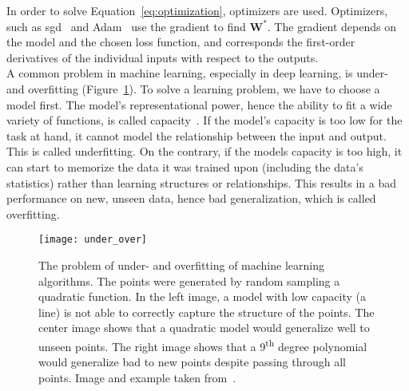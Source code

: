 In order to solve Equation~\ref{eq:optimization}, optimizers are used. Optimizers, such as \gls{sgd}~\cite{Goodfellow2016DeepLearning} and Adam~\cite{Kingma2014Adam:Optimization} use the gradient to find $\textbf{W}^*$. The gradient depends on the model and the chosen loss function, and corresponds the first-order derivatives of the individual inputs with respect to the outputs.\\

A common problem in machine learning, especially in deep learning, is under- and overfitting (Figure~\ref{fig:under_over_fitting}). To solve a learning problem, we have to choose a model first. The model's representational power, hence the ability to fit a wide variety of functions, is called capacity~\cite{Goodfellow2016DeepLearning}. If the model's capacity is too low for the task at hand, it cannot model the relationship between the input and output. This is called underfitting. On the contrary, if the models capacity is too high, it can start to memorize the data it was trained upon (including the data's statistics) rather than learning structures or relationships. This results in a bad performance on new, unseen data, hence bad generalization, which is called overfitting.

\begin{figure}[htbp]
    \centering
	\texttt{[image: under\_over]}
    \caption[Under- and Overfitting]{The problem of under- and overfitting of machine learning algorithms. The points were generated by random sampling a quadratic function. In the left image, a model with low capacity (a line) is not able to correctly capture the structure of the points. The center image shows that a quadratic model would generalize well to unseen points. The right image shows that a 9\textsuperscript{th} degree polynomial would generalize bad to new points despite passing through all points. Image and example taken from~\cite{Goodfellow2016DeepLearning}.}
    \label{fig:under_over_fitting}
\end{figure}


